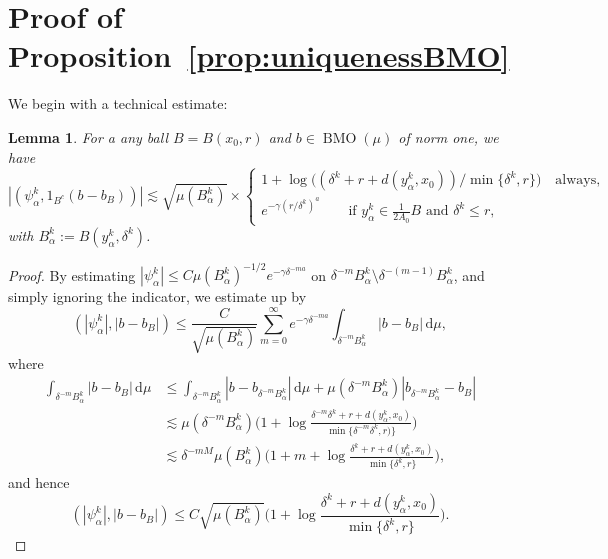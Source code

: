 \documentclass{amsart}
\numberwithin{equation}{section}
\theoremstyle{plain}
\newtheorem{lemma}[equation]{Lemma}
\theoremstyle{definition}
\theoremstyle{remark}
\begin{document}
{{{ 
\appendix

\section{Proof of Proposition~\ref{prop:uniquenessBMO}}\label{app:BMO}
 
 
 We begin with a technical estimate:
 
\begin{lemma}\label{lem:ballComplement}
For a any ball $B=B(x_0,r)$ and $b\in{\operatorname{BMO}}(\mu)$ of norm one, we have
\begin{equation*}
  {|{(\psi^k_\alpha,1_{B^c}(b-b_B))}|}\lesssim\sqrt{\mu(B^k_\alpha)}\times
  \begin{cases} 1+\log\big((\delta^{k}+r+d(y^k_\alpha,x_0))/\min\{\delta^k,r\}\big) \quad \text{always}, \\
  e^{-\gamma(r/\delta^k)^a} \qquad \text{if }y^k_\alpha\in\frac{1}{2A_0}B\text{ and }\delta^k\leq r,
  \end{cases}
\end{equation*}
with $B^k_\alpha:=B(y^k_\alpha,\delta^k)$.
\end{lemma}

\begin{proof}

By estimating ${|{\psi^k_\alpha}|}\leq C\mu(B^k_\alpha)^{-1/2}e^{-\gamma\delta^{-ma}}$ on $\delta^{-m}B^k_\alpha\setminus\delta^{-(m-1)}B^k_\alpha$, and simply ignoring the indicator, we estimate up by
\begin{equation*}
 ({|{\psi^k_\alpha}|},{|{b-b_B}|})\leq \frac{C}{\sqrt{\mu(B^k_\alpha)}}\sum_{m=0}^{\infty}e^{-\gamma\delta^{-ma}}\int_{\delta^{-m}B^k_\alpha}{|{b-b_B}|}{\,\mathrm{d}}\mu,
\end{equation*}
where
\begin{equation*}
\begin{split}
  \int_{\delta^{-m}B^k_\alpha}{|{b-b_B}|}{\,\mathrm{d}}\mu
  &\leq \int_{\delta^{-m}B^k_\alpha}{|{b-b_{\delta^{-m}B^k_\alpha}}|}{\,\mathrm{d}}\mu+\mu(\delta^{-m}B^k_\alpha){|{b_{\delta^{-m}B^k_\alpha}-b_B}|} \\
  &\lesssim \mu(\delta^{-m}B^k_\alpha)\Big(1+\log\frac{\delta^{-m}\delta^k+r+d(y^k_\alpha,x_0)}{\min\{\delta^{-m}\delta^k,r)\}}\Big) \\
  &\lesssim \delta^{-mM}\mu(B^k_\alpha)\Big(1+m+\log\frac{\delta^{k}+r+d(y^k_\alpha,x_0)}{\min\{\delta^k,r\}}\Big),
\end{split}
\end{equation*}
and hence
\begin{equation*}
  ({|{\psi^k_\alpha}|},{|{b-b_B}|})\leq C\sqrt{\mu(B^k_\alpha)}\Big(1+\log\frac{\delta^{k}+r+d(y^k_\alpha,x_0)}{\min\{\delta^k,r\}}\Big).
\end{equation*}


\end{proof}}}}
\end{document}
